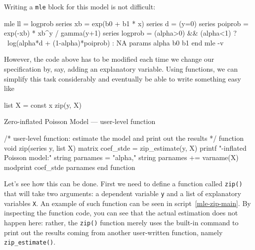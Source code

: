 Writing a \texttt{mle} block for this model is not difficult:
\begin{code}
mle ll = logprob
  series xb = exp(b0 + b1 * x)
  series d = (y=0)
  series poiprob = exp(-xb) * xb^y / gamma(y+1)
  series logprob = (alpha>0) && (alpha<1) ? \
    log(alpha*d + (1-alpha)*poiprob) : NA
  params alpha b0 b1
end mle -v
\end{code}

However, the code above has to be modified each time we change our
specification by, say, adding an explanatory variable.  Using
functions, we can simplify this task considerably and eventually be
able to write something easy like
\begin{code}
list X = const x
zip(y, X)
\end{code}

\begin{script}[htbp]
  \caption{Zero-inflated Poisson Model --- user-level function}
  \label{mle-zip-main}
\begin{scode}
/*
  user-level function: estimate the model and print out
  the results
*/
function void zip(series y, list X)
    matrix coef_stde = zip_estimate(y, X)
    printf "\nZero-inflated Poisson model:\n"
    string parnames = "alpha,"
    string parnames += varname(X)
    modprint coef_stde parnames
end function
\end{scode}
\end{script}

Let's see how this can be done.  First we need to define a function
called \texttt{zip()} that will take two arguments: a dependent
variable \texttt{y} and a list of explanatory variables \texttt{X}. An
example of such function can be seen in script~\ref{mle-zip-main}. By
inspecting the function code, you can see that the actual estimation
does not happen here: rather, the \texttt{zip()} function merely
uses the built-in \cmd{modprint} command to print out the results
coming from another user-written function, namely
\texttt{zip\_estimate()}.

